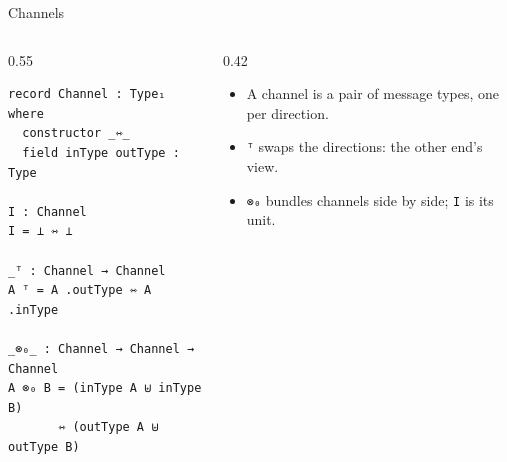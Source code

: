 \documentclass[aspectratio=169,10pt]{beamer}
\newcommand{\agda}[1]{\texttt{#1}}
\begin{document}
\begin{frame}[fragile]{Channels}
  \begin{columns}[T]
    \begin{column}{0.55\textwidth}
\begin{verbatim}
record Channel : Type₁ where
  constructor _⇿_
  field inType outType : Type

I : Channel
I = ⊥ ⇿ ⊥

_ᵀ : Channel → Channel
A ᵀ = A .outType ⇿ A .inType

_⊗₀_ : Channel → Channel → Channel
A ⊗₀ B = (inType A ⊎ inType B)
       ⇿ (outType A ⊎ outType B)
\end{verbatim}
    \end{column}
    \begin{column}{0.42\textwidth}
      \begin{itemize}
        \item A channel is a pair of message types, one per direction.
        \item \agda{ᵀ} swaps the directions: the other end's view.
        \item \agda{⊗₀} bundles channels side by side; \agda{I} is its unit.
      \end{itemize}

      \vspace{3mm}
      \centering
    \end{column}
  \end{columns}
\end{frame}
\end{document}
